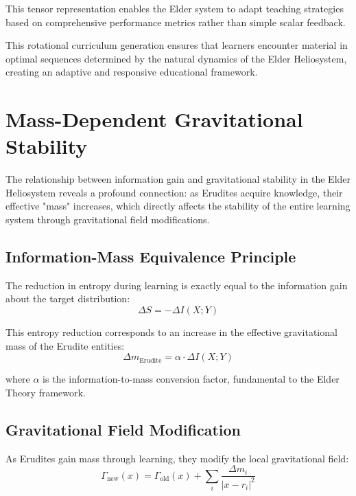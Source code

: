This tensor representation enables the Elder system to adapt teaching strategies based on comprehensive performance metrics rather than simple scalar feedback.

This rotational curriculum generation ensures that learners encounter material in optimal sequences determined by the natural dynamics of the Elder Heliosystem, creating an adaptive and responsive educational framework.

\section{Mass-Dependent Gravitational Stability}

The relationship between information gain and gravitational stability in the Elder Heliosystem reveals a profound connection: as Erudites acquire knowledge, their effective "mass" increases, which directly affects the stability of the entire learning system through gravitational field modifications.

\subsection{Information-Mass Equivalence Principle}

The reduction in entropy during learning is exactly equal to the information gain about the target distribution:
\begin{equation}
\Delta S = -\Delta I(X; Y)
\end{equation}

This entropy reduction corresponds to an increase in the effective gravitational mass of the Erudite entities:
\begin{equation}
\Delta m_{\text{Erudite}} = \alpha \cdot \Delta I(X; Y)
\end{equation}

where $\alpha$ is the information-to-mass conversion factor, fundamental to the Elder Theory framework.

\subsection{Gravitational Field Modification}

As Erudites gain mass through learning, they modify the local gravitational field:
\begin{equation}
\Gamma_{\text{new}}(x) = \Gamma_{\text{old}}(x) + \sum_{i} \frac{\Delta m_i}{|x - r_i|^2}
\end{equation}

